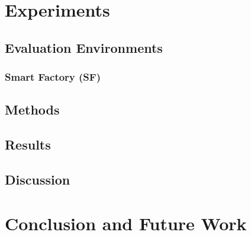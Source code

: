 \section{Experiments}\label{sec:experiments}


\subsection{Evaluation Environments}\label{subsec:environments}


\subsubsection{Smart Factory (SF)}


\subsection{Methods}


\subsection{Results}


\subsection{Discussion}


\section{Conclusion and Future Work}\label{sec:conclusion}
